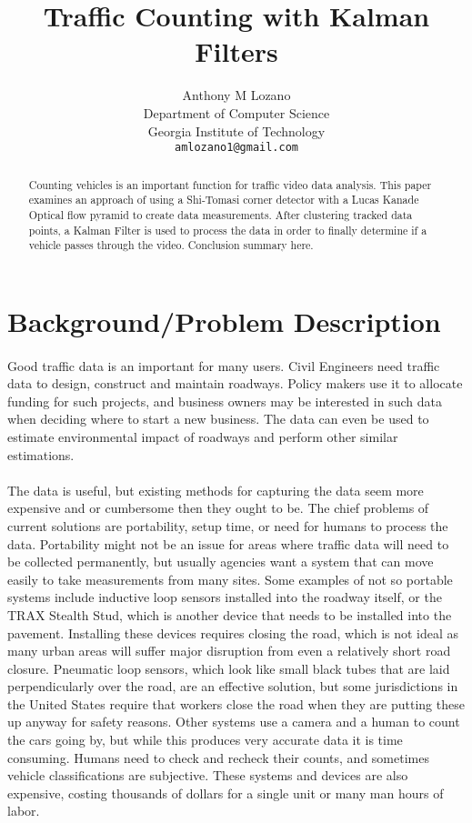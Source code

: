\documentclass{article} %
\title{Traffic Counting with Kalman Filters}
\author{
Anthony M Lozano\\
Department of Computer Science\\
Georgia Institute of Technology\\
\texttt{amlozano1@gmail.com} \\
}
\begin{document}
\maketitle

\begin{abstract}
Counting vehicles is an important function for traffic video data analysis. This paper examines an approach of using a Shi-Tomasi corner detector with a Lucas Kanade Optical flow pyramid to create data measurements. After clustering tracked data points, a Kalman Filter is used to process the data in order to finally determine if a vehicle passes through the video. Conclusion summary here.
\end{abstract}

\section{Background/Problem Description}

\paragraph*{}Good traffic data is an important for many users.  Civil Engineers need traffic data to design, construct and maintain roadways.  Policy makers use it to allocate funding for such projects, and business owners may be interested in such data when deciding where to start a new business.  The data can even be used to estimate environmental impact of roadways and perform other similar estimations.
\paragraph*{}The data is useful, but existing methods for capturing the data seem more expensive and or cumbersome then they ought to be.  The chief problems of current solutions are portability, setup time, or need for humans to process the data.  Portability might not be an issue for areas where traffic data will need to be collected permanently, but usually agencies want a system that can move easily to take measurements from many sites.  Some examples of not so portable systems include inductive loop sensors installed into the roadway itself, or the TRAX Stealth Stud, which is another device that needs to be installed into the pavement.  Installing these devices requires closing the road, which is not ideal as many urban areas will suffer major disruption from even a relatively short road closure.  Pneumatic loop sensors, which look like small black tubes that are laid perpendicularly over the road, are an effective solution, but some jurisdictions in the United States require that workers close the road when they are putting these up anyway for safety reasons.  Other systems use a camera and a human to count the cars going by, but while this produces very accurate data it is time consuming.  Humans need to check and recheck their counts, and sometimes vehicle classifications are subjective.  These systems and devices are also expensive, costing thousands of dollars for a single unit or many man hours of labor.
\end{document}
